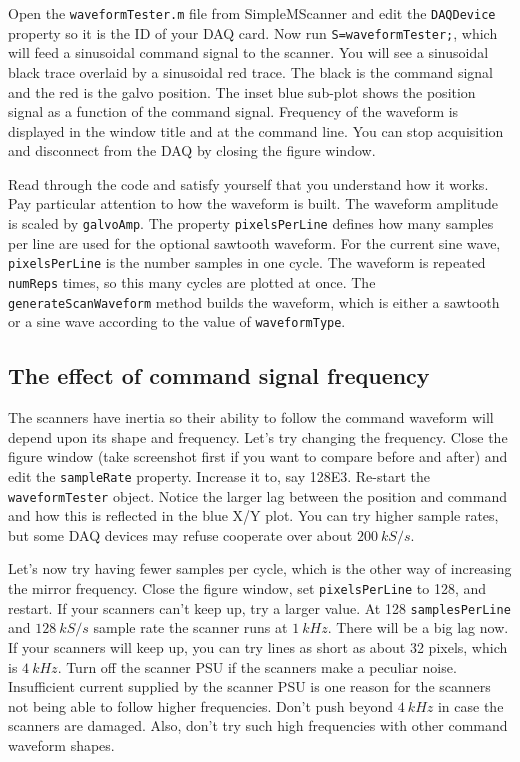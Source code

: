 \documentclass[a4paper]{report}
\begin{document}
Open the \texttt{waveformTester.m} file from SimpleMScanner and edit the \texttt{DAQDevice} property so it is the ID of your DAQ card. 
Now run \texttt{S=waveformTester;}, which will feed a sinusoidal command signal to the scanner. 
You will see a sinusoidal black trace overlaid by a sinusoidal red trace. 
The black is the command signal and the red is the galvo position. 
The inset blue sub-plot shows the position signal as a function of the command signal. 
Frequency of the waveform is displayed in the window title and at the command line. 
You can stop acquisition and disconnect from the DAQ by closing the figure window.

Read through the code and satisfy yourself that you understand how it works. 
Pay particular attention to how the waveform is built. 
The waveform amplitude is scaled by \texttt{galvoAmp}.
The property \texttt{pixelsPerLine} defines how many samples per line are used for the optional sawtooth waveform. 
For the current sine wave, \texttt{pixelsPerLine} is the number samples in one cycle. 
The waveform is repeated \texttt{numReps} times, so this many cycles are plotted at once. 
The \texttt{generateScanWaveform} method builds the waveform, which is either a sawtooth or a sine wave according to the value of \texttt{waveformType}.


\subsection{The effect of command signal frequency}
The scanners have inertia so their ability to follow the command waveform will depend upon its shape and frequency. 
Let's try changing the frequency. 
Close the figure window (take screenshot first if you want to compare before and after) and edit the \texttt{sampleRate} property.
Increase it to, say 128E3. 
Re-start the \texttt{waveformTester} object. 
Notice the larger lag between the position and command and how this is reflected in the blue X/Y plot. 
You can try higher sample rates, but some DAQ devices may refuse cooperate over about $200~kS/s$.


Let's now try having fewer samples per cycle, which is the other way of increasing the mirror frequency. 
Close the figure window, set \texttt{pixelsPerLine} to 128, and restart.
If your scanners can't keep up, try a larger value. 
At 128 \texttt{samplesPerLine} and $128~kS/s$ sample rate the scanner runs at $1~kHz$. 
There will be a big lag now. 
If your scanners will keep up, you can try lines as short as about 32 pixels, which is $4~kHz$. 
Turn off the scanner PSU if the scanners make a peculiar noise. 
Insufficient current supplied by the scanner PSU is one reason for the scanners not being able to follow higher frequencies.
Don't push beyond $4~kHz$ in case the scanners are damaged.
Also, don't try such high frequencies with other command waveform shapes.
\end{document}
